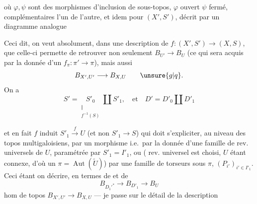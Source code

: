 
où $\varphi,\psi$ sont des morphismes d'inclusion de sous-topos, $\varphi$ ouvert $\psi$ fermé, complémentaires l'un de l'autre, et idem pour $(X',S')$, décrit par un diagramme analogue

Ceci dit, on veut absolument, dans une description de
$f:(X',S')\longrightarrow(X,S)$, que celle-ci permette de retrouver non seulement $B_{U'}\longrightarrow B_U$ (ce qui sera acquis par la donnée d'un $f_\pi:\pi'\longrightarrow\pi$), mais aussi
\[
B_{X',U'}\longrightarrow B_{X,U}\qquad\unsure{g|q}.
\]
On a 
\[
S'=\underset{\substack{\Vert\\f^{-1}(S)}}{S'_0}\amalg S'_1,
\quad\text{et}\quad D'=D'_0\amalg D'_1
\]


et en fait $f$ induit $S'_1\xrightarrow{f}U$ (et non $S'_1\longrightarrow S$) qui doit s'expliciter, au niveau  des topos multigaloisiens, par un morphisme
i.e.\ par la donnée d'une famille de rev. universels de $U$, paramétrée par $S'_1=I'_1$, ou ( rev. universel est choisi, $U$ étant connexe, d'où un $\pi=\operatorname{Aut}(\widetilde U)$) par une famille de torseurs sous  $\pi$, $(P_{i'})_{i'\in I'_1}$.
Ceci étant   on  décrire, en termes de
et de
\[
B_{D_1'^*}\longrightarrow B_{D'_1}\longrightarrow B_U
\]
  hom de topos $B_{X',U'}\longrightarrow B_{X,U}$
--- je passe sur le détail de la description

